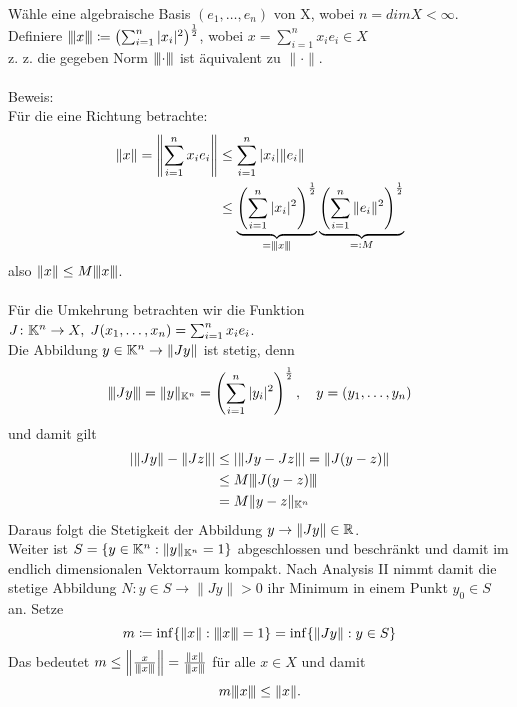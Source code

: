 \begin{beweis}
	Wähle eine algebraische Basis $(e_{1}, \dotsc, e_{n})$ von X, wobei $ n = dim X < \infty$. \\
	Definiere $ \vertiii{x} \coloneqq \left(\sum_{i = 1}^{n} |x_{i}|^2\right)^{\frac{1}{2}}$, wobei $x = \sum_{i = 1}^{n} x_{i} e_{i} \in X$ \\
	
	z. z. die gegeben Norm $\vertiii{ \cdot }$ ist äquivalent zu $\| \cdot \|$. \\ \\
	Beweis: \\
	Für die eine Richtung betrachte: 
	\begin{align*}
		\| x \| = \left\| \sum_{i = 1}^{n} x_{i} e_{i} \right\| & \leq \sum_{i = 1}^{n} |x_{i}| \|  e_{i} \| \\ 
													& \leq \underbrace{ \left( \sum_{i = 1}^{n} |x_{i}|^{2} \right)^\frac{1}{2} }_{= \vertiii{ x }} \underbrace{ \left( \sum_{i = 1}^{n} \| e_{i} \|^{2} \right)^\frac{1}{2} }_{=: M}
	\end{align*}
	also $\| x \| \leq M \vertiii{ x }$. \\ \\
	Für die Umkehrung betrachten wir die Funktion $J \colon \MdK^{n} \rightarrow X, \hspace{0.1cm} J(x_{1}, \dotsc, x_{n}) = \sum_{i = 1}^{n} x_{i} e_{i}$. \\
	Die Abbildung $y \in \MdK^{n} \rightarrow \| Jy \| $ ist stetig, denn
	 \[ \vertiii{ Jy } = \| y \|_{\MdK^{n}} = \left( \sum_{i = 1}^{n} |y_{i}|^{2} \right)^{\frac{1}{2}}, \quad y = (y_{1}, \dotsc, y_{n}) \]
	und damit gilt 
	\begin{align*}
 	 	 \left| \| Jy \| - \| Jz \| \right| & \leq |  \| Jy - Jz \| | =  \| J(y - z) \| \\
 	 	 & \leq M \vertiii{ J (y - z) } \\
 	 	 & = M \| y - z \|_{\MdK^{n}}
 	 \end{align*}
 	Daraus folgt die Stetigkeit der Abbildung $ y \rightarrow \| Jy \| \in \MdR$. \\
	Weiter ist $S = \{y \in \MdK^{n}: \| y \|_{\MdK^n} = 1 \}$ abgeschlossen und beschränkt und damit im endlich dimensionalen Vektorraum kompakt. Nach Analysis II nimmt damit die stetige Abbildung $N \colon y \in S \rightarrow \| Jy \| > 0$ ihr Minimum in einem Punkt $y_{0} \in S$ an. Setze
		\[ m \coloneqq \inf\{\| x \| : \vertiii{ x } = 1\} = \inf \{ \| Jy \|: y \in S \} \]
	Das bedeutet $m \leq \left\| \frac{x}{ \vertiii{ x } } \right\| =  \frac{ \| x \| }{ \vertiii{ x } }$ für alle $x \in X$ und damit
		\[ m \vertiii{ x } \leq \| x \|. \]
\end{beweis}

